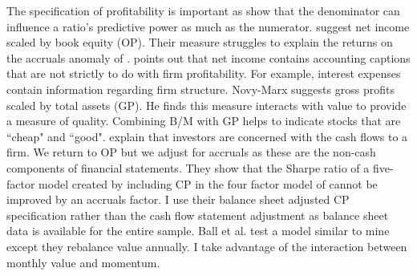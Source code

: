 The specification of profitability is important as \textcite{ball2015deflating}
show that the denominator can influence a ratio's predictive power as much as
the numerator.
\textcite{fama2006profitability} suggest net income scaled by book equity (OP).
Their measure struggles to explain the returns on the accruals anomaly of
\textcite{sloan1996stock}.
\textcite{novy2013other} points out that net income contains accounting
captions that are not strictly to do with firm profitability.
For example, interest expenses contain information regarding firm structure.
Novy-Marx suggests gross profits scaled by total assets (GP).
He finds this measure interacts with value to provide a measure of quality.
Combining B/M with GP helps to indicate stocks that are ``cheap" and ``good".
\textcite{ball2016accruals} explain that investors are concerned with the cash
flows to a firm.
We return to OP but we adjust for accruals as these are the non-cash
components of financial statements.
They show that
the Sharpe ratio of a five-factor model created by including CP in the
four factor model of \textcite{carhart1997persistence} cannot be
improved by an accruals factor.
I use their balance sheet adjusted CP specification rather than the cash flow
statement adjustment as balance sheet data is available for the entire sample.
Ball et al. test a model similar to mine except they rebalance value annually.
I take advantage of the interaction between monthly value and momentum.

